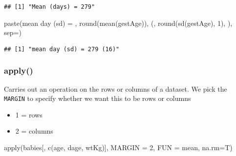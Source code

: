\documentclass[
]{book}
\newenvironment{Shaded}{\begin{snugshade}}{\end{snugshade}}
\newcommand{\AttributeTok}[1]{\textcolor[rgb]{0.77,0.63,0.00}{#1}}
\newcommand{\DecValTok}[1]{\textcolor[rgb]{0.00,0.00,0.81}{#1}}
\newcommand{\FunctionTok}[1]{\textcolor[rgb]{0.00,0.00,0.00}{#1}}
\newcommand{\NormalTok}[1]{#1}
\newcommand{\StringTok}[1]{\textcolor[rgb]{0.31,0.60,0.02}{#1}}
\providecommand{\tightlist}{%
  \setlength{\itemsep}{0pt}\setlength{\parskip}{0pt}}
\begin{document}
\begin{verbatim}
## [1] "Mean (days) = 279"
\end{verbatim}

\begin{Shaded}
\begin{Highlighting}[]
\FunctionTok{paste}\NormalTok{(}\StringTok{\textquotesingle{}mean day (sd) = \textquotesingle{}}\NormalTok{, }
      \FunctionTok{round}\NormalTok{(}\FunctionTok{mean}\NormalTok{(gestAge)), }
      \StringTok{\textquotesingle{} (\textquotesingle{}}\NormalTok{, }
      \FunctionTok{round}\NormalTok{(}\FunctionTok{sd}\NormalTok{(gestAge), }\DecValTok{1}\NormalTok{), }
      \StringTok{\textquotesingle{})\textquotesingle{}}\NormalTok{, }
      \AttributeTok{sep=}\StringTok{\textquotesingle{}\textquotesingle{}}\NormalTok{)}
\end{Highlighting}
\end{Shaded}

\begin{verbatim}
## [1] "mean day (sd) = 279 (16)"
\end{verbatim}

\hypertarget{apply}{%
\subsubsection*{apply()}\label{apply}}

Carries out an operation on the rows or columns of a dataset. We pick the \texttt{MARGIN} to specify whether we want
this to be rows or columns

\begin{itemize}
\tightlist
\item
  1 = rows
\item
  2 = columns
\end{itemize}

\begin{Shaded}
\begin{Highlighting}[]
\FunctionTok{apply}\NormalTok{(babies[, }\FunctionTok{c}\NormalTok{(}\StringTok{\textquotesingle{}age\textquotesingle{}}\NormalTok{, }\StringTok{\textquotesingle{}dage\textquotesingle{}}\NormalTok{, }\StringTok{\textquotesingle{}wtKg\textquotesingle{}}\NormalTok{)], }\AttributeTok{MARGIN =} \DecValTok{2}\NormalTok{, }\AttributeTok{FUN =}\NormalTok{ mean, }\AttributeTok{na.rm=}\NormalTok{T)}
\end{Highlighting}
\end{Shaded}
\end{document}
